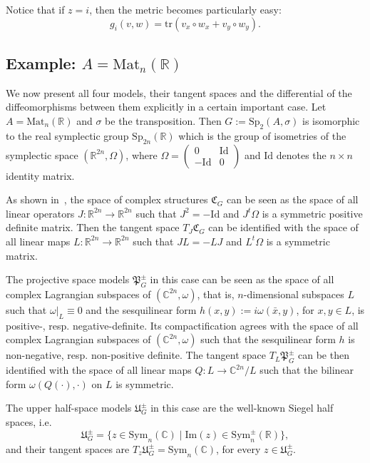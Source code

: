 \documentclass[oneside,11pt]{amsart}
\theoremstyle{definition}
\theoremstyle{remark}
\numberwithin{thm}{section}
\numberwithin{equation}{section}
\begin{document}
Notice that if $z=i$, then the metric becomes particularly easy: 
$$g_i(v,w)=\mathrm{tr}(v_x\circ w_x+v_y\circ w_y).$$



\subsection{Example: \texorpdfstring{$A=\mathrm{Mat}_n(\mathbb R)$}{}}\label{sec:exam_A_real_mat}
We now present all four models, their tangent spaces and the differential of the diffeomorphisms between them explicitly in a certain important case. Let $A=\mathrm{Mat}_n(\mathbb R)$ and $\sigma$ be the transposition. Then $G:=\mathrm{Sp}_2(A,\sigma)$ is isomorphic to the real symplectic group $\mathrm{Sp}_{2n}(\mathbb R)$ which is the group of isometries of the symplectic space $(\mathbb R^{2n}, \Omega)$, where $\Omega=\begin{pmatrix} 0 & \mathrm{Id} \\ -\mathrm{Id} & 0 \end{pmatrix}$ and $\mathrm{Id}$ denotes the $n\times n$ identity matrix.

    As shown in~\cite{ABRRW}, the space of complex structures $\mathfrak{C}_G$ can be seen as the space of all linear operators $J\colon \mathbb R^{2n}\to\mathbb R^{2n}$ such that $J^2=-\mathrm{Id}$ and $J^t\Omega$ is a symmetric positive definite matrix. Then the tangent space $T_J\mathfrak{C}_G$ can be identified with the space of all linear maps $L\colon \mathbb R^{2n}\to\mathbb R^{2n}$ such that $JL=-LJ$ and $L^t\Omega$ is a symmetric matrix.

    The projective space models $\mathfrak{P}_G^\pm$ in this case can be seen as the space of all complex Lagrangian subspaces of $(\mathbb C^{2n},\omega)$, that is, $n$-dimensional subspaces $L$ such that $\omega|_L\equiv 0$ and the sesquilinear form $h(x,y):=i\omega(\bar x,y)$, for $x,y\in L$, is positive-, resp. negative-definite. Its compactification agrees with the space of all complex Lagrangian subspaces of $(\mathbb C^{2n},\omega)$ such that the sesquilinear form $h$ is non-negative, resp. non-positive definite. The tangent space $T_L\mathfrak{P}_G^\pm$ can be then identified with the space of all linear maps $Q\colon L\to \mathbb{C}^{2n}/L$ such that the bilinear form $\omega(Q(\cdot),\cdot)$ on $L$ is symmetric. 

    The upper half-space models $\mathfrak U_G^\pm$ in this case are the well-known Siegel half spaces, i.e. 
    $$\mathfrak U_G^\pm=\{z\in\mathrm{Sym}_n(\mathbb C)\mid\mathrm{Im}(z)\in\mathrm{Sym}^\pm_n(\mathbb R)\},$$
    and their tangent spaces are $T_z\mathfrak U_G^\pm=\mathrm{Sym}_n(\mathbb C)$, for every $z\in\mathfrak U_G^\pm$.
\end{document}
